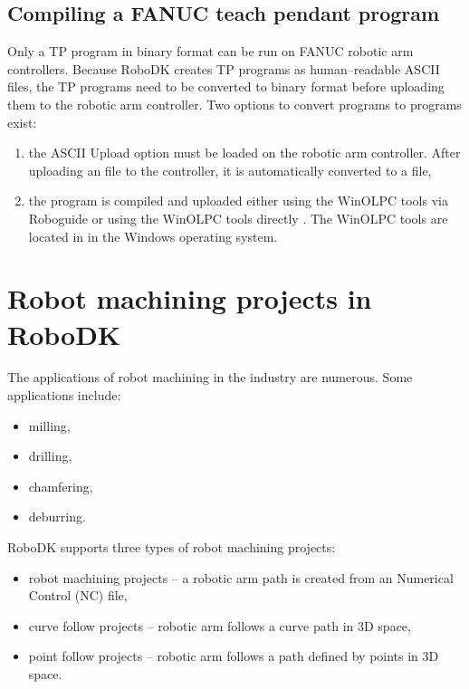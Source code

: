 \subsection{Compiling a FANUC teach pendant program}

Only a TP program in binary format can be run on FANUC robotic arm controllers. Because RoboDK creates TP programs as human--readable ASCII files, the TP programs need to be converted to binary format before uploading them to the robotic arm controller. Two options to convert  programs to  programs exist:

\begin{enumerate}
\item the ASCII Upload option must be loaded on the robotic arm controller. After uploading an  file to the controller, it is automatically converted to a  file,
\item the program is compiled and uploaded either using the WinOLPC  tools via Roboguide or using the WinOLPC tools directly \cite{fanuchandling}. The WinOLPC tools are located in  in the Windows operating system.

\end{enumerate}

\section{Robot machining projects in RoboDK}

The applications of robot machining in the industry are numerous. Some applications include:

\begin{itemize}

    \item milling,
    \item drilling,
    \item chamfering,
    \item deburring.

\end{itemize}

RoboDK supports three types of robot machining projects:

\begin{itemize}

    \item robot machining projects -- a robotic arm path is created from an Numerical Control (NC) file,
    \item curve follow projects -- robotic arm follows a curve path in 3D space, 
    \item point follow projects -- robotic arm follows a path defined by points in 3D space.

\end{itemize}

